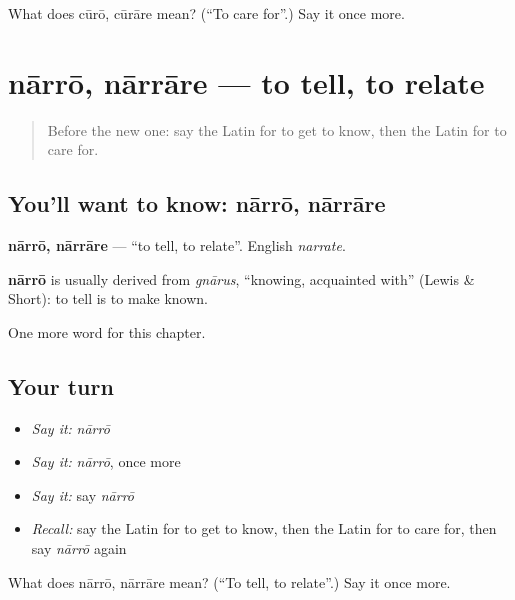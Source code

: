 \begin{tcolorbox}[breakable,colback=teal!4,colframe=teal!35!black,title={Before you move on}]
What does cūrō, cūrāre mean? (\textquotedblleft{}To care for\textquotedblright{}.) Say it once more.
\end{tcolorbox}
\section[nārrō, nārrāre]{nārrō, nārrāre — to tell, to relate}

\label{lesson:LA-C99-narro}



\begin{quote}
Before the new one: say the Latin for to get to know, then the Latin for to care for.
\end{quote}

\subsection*{You'll want to know: nārrō, nārrāre}
\textbf{nārrō, nārrāre} — \textquotedblleft{}to tell, to relate\textquotedblright{}. English \emph{narrate}.

\begin{cousinweb}
\textbf{nārrō} is usually derived from \emph{gnārus}, \textquotedblleft{}knowing, acquainted with\textquotedblright{} (Lewis \& Short): to tell is to make known.
\end{cousinweb}

\begin{grammarlens}[title={What you've built}]
One more word for this chapter.
\end{grammarlens}

\subsection*{Your turn}
\begin{itemize}
\raggedright
  \item \emph{Say it:} \emph{nārrō}
  \item \emph{Say it:} \emph{nārrō}, once more
  \item \emph{Say it:} say \emph{nārrō}
  \item \emph{Recall:} say the Latin for to get to know, then the Latin for to care for, then say \emph{nārrō} again
\end{itemize}

\begin{tcolorbox}[breakable,colback=teal!4,colframe=teal!35!black,title={Before you move on}]
What does nārrō, nārrāre mean? (\textquotedblleft{}To tell, to relate\textquotedblright{}.) Say it once more.
\end{tcolorbox}
